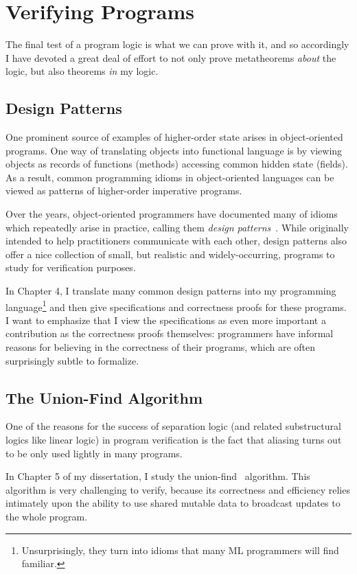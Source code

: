 \section{Verifying Programs}

The final test of a program logic is what we can prove with it, and so
accordingly I have devoted a great deal of effort to not only prove
metatheorems \emph{about} the logic, but also theorems \emph{in} my
logic.

\subsection{Design Patterns}

One prominent source of examples of higher-order state arises in
object-oriented programs. One way of translating objects into
functional language is by viewing objects as records of functions
(methods) accessing common hidden state (fields). As a result, common
programming idioms in object-oriented languages can be viewed as
patterns of higher-order imperative programs.

Over the years, object-oriented programmers have documented many of
idioms which repeatedly arise in practice, calling them \emph{design
  patterns}~\cite{gof}. While originally intended to help practitioners
communicate with each other, design patterns also offer a nice collection 
of small, but realistic and widely-occurring, programs to study for
verification purposes. 

In Chapter 4, I translate many common design patterns into my
programming language\footnote{Unsurprisingly, they turn into idioms
  that many ML programmers will find familiar.} and then give
specifications and correctness proofs for these programs. I want to
emphasize that I view the specifications as even more important a
contribution as the correctness proofs themselves: programmers have
informal reasons for believing in the correctness of their programs,
which are often surprisingly subtle to formalize. 

\subsection{The Union-Find Algorithm}

One of the reasons for the success of separation logic (and related
substructural logics like linear logic) in program verification is the
fact that aliasing turns out to be only used lightly in many
programs. 

In Chapter 5 of my dissertation, I study the
union-find~\cite{union-find} algorithm. This algorithm is very
challenging to verify, because its correctness and efficiency relies
intimately upon the ability to use shared mutable data to broadcast
updates to the whole program.

